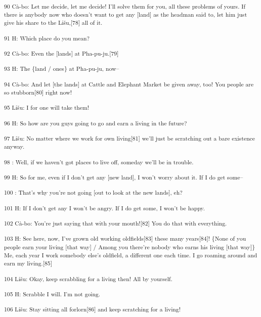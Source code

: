 {\textsuperscript{90 Cà-bo: Let me decide, let me decide! I'll solve them
for you, all these problems of yours. If there is anybody now who doesn't want
to get any [land] as the headman said to, let him just give his share to the Lišu,[78]
all of it. }}

{\textsuperscript{91 H: Which place do you mean? }}

{\textsuperscript{92 Cà-bo: Even the [lands] at Pha-pu-ju.[79]}}

{\textsuperscript{93 H: The \{land / ones\} at Pha-pu-ju, now--}}

{\textsuperscript{94 Cà-bo: And let [the lands] at Cattle and Elephant
Market be given away, too! You people are so stubborn[80] right now! }}

{\textsuperscript{95 Lišu: I for one will take them!}}

{\textsuperscript{96 H: So how are you guys going to go and earn a living
in the future?}}

{\textsuperscript{97 Lišu: No matter where we work for own living[81] we'll
just be scratching out a bare existence anyway.}}

{\textsuperscript{98        : Well, if we haven't got places to live off,
someday we'll be in trouble.}}

{\textsuperscript{99 H: So for me, even if I don't get any [new land], I
won't worry about it. If I do get some--}}

{\textsuperscript{100 : That's why you're not going [out to look at the
new lands], eh?}}

{\textsuperscript{101 H: If I don't get any I won't be angry. If I do get
some, I won't be happy.}}

{\textsuperscript{102 Cà-bo: You're just saying that with your mouth![82]
You do that with everything.}}

{\textsuperscript{103 H: See here, now, I've grown old working oldfields[83]
these many years[84]! \{None of you people earn your living [that way] / Among
you there're nobody who earns his living [that way]\} Me, each year I work somebody
else's oldfield, a different one each time. I go roaming around and earn my living.[85]}}

{\textsuperscript{104 Lišu: Okay, keep scrabbling for a living then! All
by yourself.}}

{\textsuperscript{105 H: Scrabble I will. I'm not going.}}

{\textsuperscript{106 Lišu: Stay sitting all forlorn[86] and keep scratching
for a living!}}

